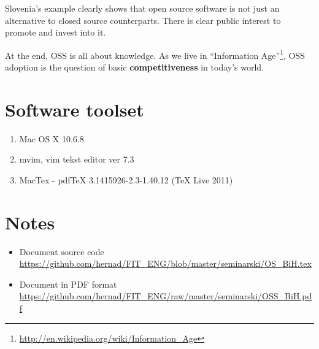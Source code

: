 \documentclass[times, utf8, seminar]{fit}
\begin{document}
Slovenia's example clearly shows that open source software is not just an alternative to closed source counterparts. There is clear public interest to promote and invest into it. 

At the end, OSS is all about knowledge. As we live in ``Information Age''\footnote{\url{http://en.wikipedia.org/wiki/Information\_Age}}, OSS adoption is the question of basic \textbf{competitiveness} in today's world. 




\appendix

\chapter{Software toolset}
\begin{enumerate}
  \item Mac OS X 10.6.8
  \item mvim, vim tekst editor ver 7.3
  \item MacTex - pdfTeX 3.1415926-2.3-1.40.12 (TeX Live 2011)
\end{enumerate}

\chapter{Notes}

\begin{itemize}
  \item Document source code \url{https://github.com/hernad/FIT_ENG/blob/master/seminarski/OS_BiH.tex}
  \item Document in PDF format \url{https://github.com/hernad/FIT_ENG/raw/master/seminarski/OSS_BiH.pdf}
\end{itemize}
\end{document}
